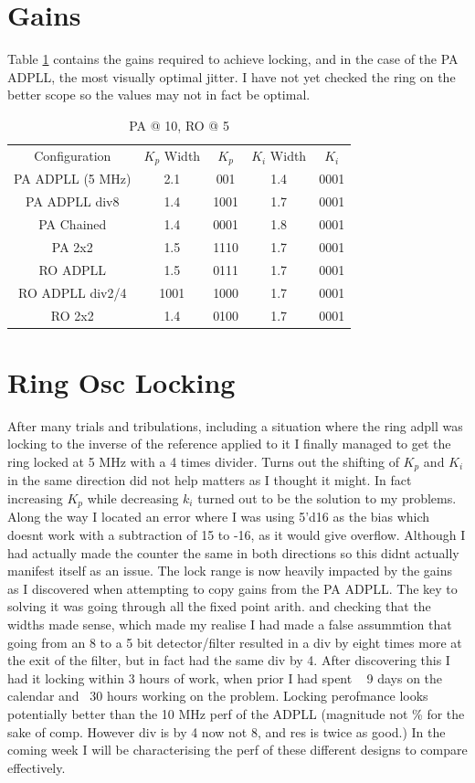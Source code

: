 \documentclass[a4paper,12pt]{report}
\begin{document}
\section*{Gains}
Table \ref{table:sdf} contains the gains required to achieve locking, and in the case of the PA ADPLL, the most visually optimal jitter. I have not yet checked the ring on the better scope so the values may not in fact be optimal.
\begin{table}[!ht]
	\begin{center} 
		\begin{tabular}{c|c|c|c|c}           
			Configuration & $K_p$ Width & $K_p$ & $K_i$ Width & $K_i$ \\
			PA ADPLL (5 MHz) & 2.1 & 001  & 1.4 & 0001 \\
			PA ADPLL div8 & 1.4 & 1001 & 1.7 & 0001 \\
			PA Chained & 1.4 & 0001 & 1.8 & 0001 \\
			PA 2x2 & 1.5 & 1110 & 1.7 & 0001 \\
			RO ADPLL & 1.5 & 0111 & 1.7 & 0001 \\
			RO ADPLL div2/4 & 1001 & 1000 & 1.7 & 0001 \\
            RO 2x2 & 1.4 & 0100 & 1.7 & 0001 \\
		\end{tabular}
		\caption{PA @ 10, RO @ 5}
		\label{table:sdf}
	\end{center}
\end{table}
	
\section*{Ring Osc Locking}
After many trials and tribulations, including a situation where the ring adpll was locking to the inverse of the reference applied to it I finally managed to get the ring locked at 5 MHz with a 4 times divider. Turns out the shifting of $K_p$ and $K_i$ in the same direction did not help matters as I thought it might.
In fact increasing $K_p$ while decreasing $k_i$ turned out to be the solution to my problems.
Along the way I located an error where I was using 5'd16 as the bias which doesnt work with a subtraction of 15 to -16, as it would give overflow. Although I had actually  made the counter the same in both directions so this didnt actually manifest itself as an issue.
The lock range is now heavily impacted by the gains as I discovered when attempting to copy gains from the PA ADPLL.
The key to solving it was going through all the fixed point arith. and checking that the widths made sense, which made my realise I had made a false assummtion that going from an 8 to a 5 bit detector/filter resulted in a div by eight times more at the exit of the filter, but in fact had the same div by 4.
After discovering this I had it locking within 3 hours of work, when prior I had spent ~ 9 days on the calendar and ~30 hours working on the problem. Locking perofmance looks potentially better than the 10 MHz perf of the ADPLL (magnitude not \% for the sake of comp. However div is by 4 now not 8, and res is twice as good.) In the coming week I will be characterising the perf of these different designs to compare effectively.
\end{document}
